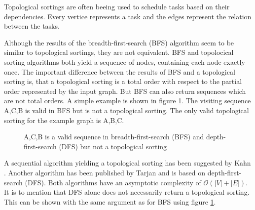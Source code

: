 Topological sortings are often beeing used to schedule tasks based on their dependencies. Every vertice represents a task and the edges represent the relation between the tasks.

Although the results of the breadth-first-search (BFS) algorithm seem to be similar to topological sortings, they are not equivalent. BFS and topolocical sorting algorithms both yield a sequence of nodes, containing each node exactly once. The important difference between the results of BFS and a topological sorting is, that a topological sorting is a total order with respect to the partial order represented by the input graph. But BFS can also return sequences which are not total orders. A simple example is shown in figure \ref{fig:diff-bfs}. The visiting sequence A,C,B is valid in BFS but is not a topological sorting. The only valid topological sorting for the example graph is A,B,C.


\begin{figure}[!hbp]
\centering
 

\caption{A,C,B is a valid sequence in breadth-first-search (BFS) and depth-first-search (DFS) but not a topological sorting}
\label{fig:diff-bfs}
\end{figure}

A sequential algorithm yielding a topological sorting has been suggested by Kahn \cite{kahn1962topological}. Another algorithm has been published by Tarjan  \cite{tarjan1976edge} and is based on depth-first-search (DFS). Both algorithms have an asymptotic complexity of $\mathcal{O}(|V|+|E|)$. It is to mention that DFS alone does not necessarily return a topological sorting. This can be shown with the same argument as for BFS using figure \ref{fig:diff-bfs}.

